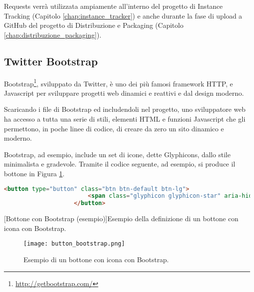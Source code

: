             Requests verrà utilizzata ampiamente all'interno del progetto di Instance Tracking (Capitolo \ref{chap:instance_tracker}) e anche durante la fase di upload a GitHub del progetto di Distribuzione e Packaging (Capitolo \ref{chap:distribuzione_packaging}).
        
        \subsection{Twitter Bootstrap} \label{subsec:p;sl;twitter_bootstrap}
        
            Bootstrap\footnote{\url{http://getbootstrap.com/}}, sviluppato da Twitter, è uno dei più famosi framework \ac{HTTP},  e Javascript per sviluppare progetti web dinamici e reattivi e dal design moderno.
            
            Scaricando i file di Bootstrap ed includendoli nel progetto, uno sviluppatore web ha accesso a tutta una serie di stili, elementi \ac{HTML} e funzioni Javascript che gli permettono, in poche linee di codice, di creare da zero un sito dinamico e moderno.
            
            Bootstrap, ad esempio, include un set di icone, dette Glyphicons, dallo stile minimalista e gradevole. Tramite il codice seguente, ad esempio, si produce il bottone in Figura \ref{fig:button_bootstrap}.
            
            \begin{center}
                \begin{lstlisting}[language=html, gobble=18]
                    <button type="button" class="btn btn-default btn-lg">
                        <span class="glyphicon glyphicon-star" aria-hidden="true"></span> Star
                    </button>
                \end{lstlisting}
                \captionsetup{textformat=empty,labelformat=empty} \vspace{-2em}
                [Bottone con Bootstrap (esempio)]{Esempio della definizione di un bottone con icona con Bootstrap.}
            \end{center}
            
        	\begin{figure}[h!]
        		\begin{center}
        			\texttt{[image: button\_bootstrap.png]}
        		\end{center}
        		\caption[Bottone con Bootstrap (esempio)]{Esempio di un bottone con icona con Bootstrap.}
        		\label{fig:button_bootstrap}
        	\end{figure}
        	
